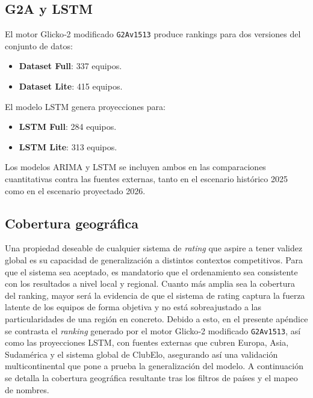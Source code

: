 \subsection{G2A y LSTM}

El motor Glicko‑2 modificado \texttt{G2Av1513} produce rankings para dos versiones del conjunto de datos:
\begin{itemize}
	\item \textbf{Dataset Full}: 337 equipos.
	\item \textbf{Dataset Lite}: 415 equipos.
\end{itemize}

El modelo LSTM genera proyecciones para:

\begin{itemize}
	\item \textbf{LSTM Full}: 284 equipos.
	\item \textbf{LSTM Lite}: 313 equipos.
\end{itemize}

Los modelos ARIMA y LSTM se incluyen ambos en las comparaciones cuantitativas contra las fuentes externas, tanto en el escenario hist\'orico 2025 como en el escenario proyectado 2026.

\subsection{Cobertura geogr\'afica}

Una propiedad deseable de cualquier sistema de \textit{rating} que aspire a tener validez global es su capacidad de generalizaci\'on a distintos contextos competitivos. Para que el sistema sea aceptado, es mandatorio que el ordenamiento sea consistente con los resultados a nivel local y regional. Cuanto m\'as amplia sea la cobertura del ranking, mayor ser\'a la evidencia de que el sistema de rating captura la fuerza latente de los equipos de forma objetiva y no est\'a sobreajustado a las particularidades de una regi\'on en concreto. Debido a esto, en el presente ap\'endice se contrasta el \textit{ranking} generado por el motor Glicko‑2 modificado \texttt{G2Av1513}, as\'i como las proyecciones LSTM, con fuentes externas que cubren Europa, Asia, Sudam\'erica y el sistema global de ClubElo, asegurando as\'i una validaci\'on multicontinental que pone a prueba la generalizaci\'on del modelo. A continuaci\'on se detalla la cobertura geogr\'afica resultante tras los filtros de pa\'ises y el mapeo de nombres.

